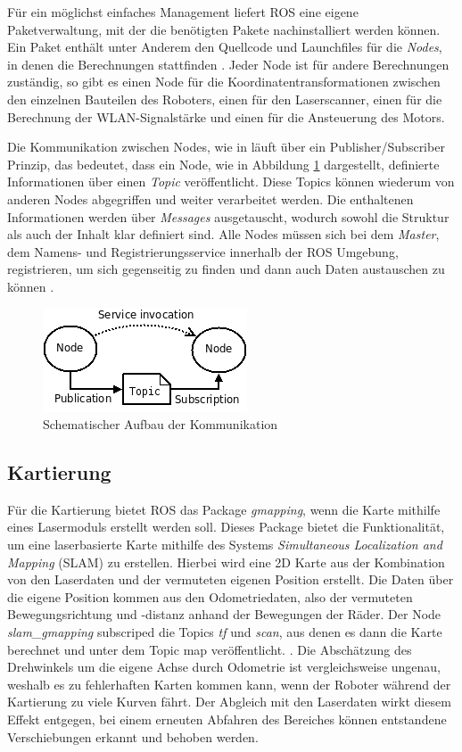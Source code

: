 \documentclass{scrartcl}%
\begin{document}
Für ein möglichst einfaches Management liefert ROS eine eigene Paketverwaltung, mit der die benötigten Pakete nachinstalliert werden können. Ein Paket enthält unter Anderem den Quellcode und Launchfiles für die \textit{Nodes}, in denen die Berechnungen stattfinden \cite{rosIntro2}. Jeder Node ist für andere Berechnungen zuständig, so gibt es einen Node für die Koordinatentransformationen zwischen den einzelnen Bauteilen des Roboters, einen für den Laserscanner, einen für die Berechnung der WLAN-Signalstärke und einen für die Ansteuerung des Motors.

Die Kommunikation zwischen Nodes, wie in  läuft über ein Publisher/Subscriber Prinzip, das bedeutet, dass ein Node, wie in Abbildung \ref{concept} dargestellt, definierte Informationen über einen \textit{Topic} veröffentlicht. Diese Topics können wiederum von anderen Nodes abgegriffen und weiter verarbeitet werden. Die enthaltenen Informationen werden über \textit{Messages} ausgetauscht, wodurch sowohl die Struktur als auch der Inhalt klar definiert sind. Alle Nodes müssen sich bei dem \textit{Master}, dem Namens- und Registrierungsservice innerhalb der ROS Umgebung, registrieren, um sich gegenseitig zu finden und dann auch Daten austauschen zu können \cite{rosKonzept}.

\begin{figure}
	\centering
	\includegraphics{bilder/ROS_concepts.png}
	\caption{Schematischer Aufbau der Kommunikation \cite{rosKonzept}}
	\label{concept}
\end{figure}

\subsection{Kartierung}
\label{kartierung}
Für die Kartierung bietet ROS das Package \textit{gmapping}, wenn die Karte mithilfe eines Lasermoduls erstellt werden soll. Dieses Package bietet die Funktionalität, um eine laserbasierte Karte mithilfe des Systems \textit{Simultaneous Localization and Mapping} (SLAM) zu erstellen. Hierbei wird eine 2D Karte aus der Kombination von den Laserdaten und der vermuteten eigenen Position erstellt. Die Daten über die eigene Position kommen aus den Odometriedaten, also der vermuteten Bewegungsrichtung und -distanz anhand der Bewegungen der Räder. Der Node \textit{slam\_gmapping} subscriped die Topics \textit{tf} und \textit{scan}, aus denen es dann die Karte berechnet und unter dem Topic map veröffentlicht. \cite{gmap}. Die Abschätzung des Drehwinkels um die eigene Achse durch Odometrie ist vergleichsweise ungenau, weshalb es zu fehlerhaften Karten kommen kann, wenn der Roboter während der Kartierung zu viele Kurven fährt. Der Abgleich mit den Laserdaten wirkt diesem Effekt entgegen, bei einem erneuten Abfahren des Bereiches können entstandene Verschiebungen erkannt und behoben werden.
\end{document}
